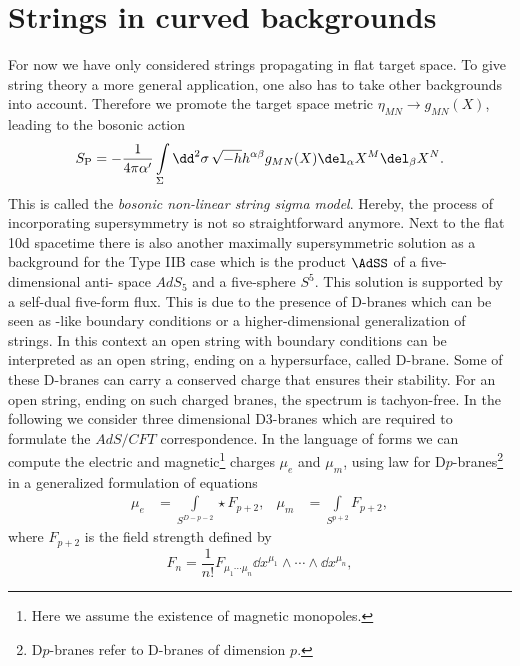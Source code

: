 \section{Strings in curved backgrounds}
For now we have only considered strings propagating in flat  target space. To give string theory a more general application, one also has to take other backgrounds into account. Therefore we promote the target space metric $\eta_{MN}\rightarrow g_{MN}(X)$, leading to the bosonic  action
%
%
\begin{equation}
S_{\rm P} = -\frac{1}{4\pi\alpha'}  \int\limits_{\Sigma} \dd^{2}\sigma\, \sqrt{-h}h^{\alpha\beta}g_{MN}(X) \del_{\alpha}X^{M}\del_{\beta}X^{N}.
\label{eq: S_P_nlsigma}
\end{equation}
%
%
This is called the \textit{bosonic non-linear string sigma model}. Hereby, the process of incorporating supersymmetry is not so straightforward anymore. Next to the flat 10d  spacetime there is also another maximally supersymmetric solution as a background for the Type IIB case which is the product $\AdSS$ of a five-dimensional anti- space $AdS_{5}$ and a five-sphere $S^{5}$. This solution is supported by a self-dual  five-form flux. This is due to the presence of D-branes which can be seen as -like boundary conditions or a higher-dimensional generalization of strings. In this context an open string with  boundary conditions can be interpreted as an open string, ending on a hypersurface, called D-brane. Some of these D-branes can carry a conserved charge that ensures their stability. For an open string, ending on such charged branes, the spectrum is tachyon-free. In the following we consider three dimensional D3-branes which are required to formulate the $AdS/CFT$ correspondence. In the language of forms we can compute the electric and magnetic\footnote{Here we assume the existence of magnetic monopoles.} charges $\mu_{e}$ and $\mu_{m}$, using  law for D$p$-branes\footnote{D$p$-branes refer to D-branes of dimension $p$.} in a generalized formulation of  equations
%
%
\begin{align}
\mu_{e} &= \int\limits_{S^{D-p-2}} \star F_{p+2},  &   \mu_{m} &= \int\limits_{S^{p+2}}  F_{p+2},
\end{align}
%
%
where $F_{p+2}$ is the field strength defined by
%
%
\begin{equation}
F_{n} = \frac{1}{n!} F_{\mu_{1}\cdots \mu_{n}} \dd x^{\mu_{1}} \wedge \cdots \wedge \dd x^{\mu_{n}},
\end{equation}
